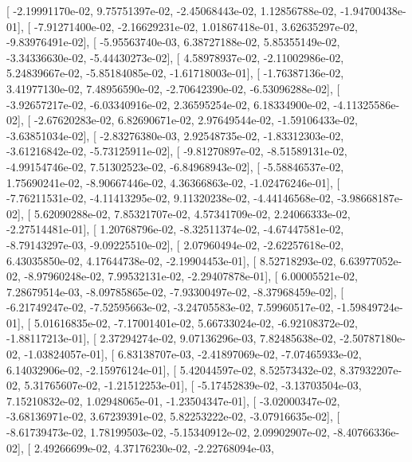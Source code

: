 \documentclass{article}
\begin{document}
       [ -2.19991170e-02,   9.75751397e-02,  -2.45068443e-02,
          1.12856788e-02,  -1.94700438e-01],
       [ -7.91271400e-02,  -2.16629231e-02,   1.01867418e-01,
          3.62635297e-02,  -9.83976491e-02],
       [ -5.95563740e-03,   6.38727188e-02,   5.85355149e-02,
         -3.34336630e-02,  -5.44430273e-02],
       [  4.58978937e-02,  -2.11002986e-02,   5.24839667e-02,
         -5.85184085e-02,  -1.61718003e-01],
       [ -1.76387136e-02,   3.41977130e-02,   7.48956590e-02,
         -2.70642390e-02,  -6.53096288e-02],
       [ -3.92657217e-02,  -6.03340916e-02,   2.36595254e-02,
          6.18334900e-02,  -4.11325586e-02],
       [ -2.67620283e-02,   6.82690671e-02,   2.97649544e-02,
         -1.59106433e-02,  -3.63851034e-02],
       [ -2.83276380e-03,   2.92548735e-02,  -1.83312303e-02,
         -3.61216842e-02,  -5.73125911e-02],
       [ -9.81270897e-02,  -8.51589131e-02,  -4.99154746e-02,
          7.51302523e-02,  -6.84968943e-02],
       [ -5.58846537e-02,   1.75690241e-02,  -8.90667446e-02,
          4.36366863e-02,  -1.02476246e-01],
       [ -7.76211531e-02,  -4.11413295e-02,   9.11320238e-02,
         -4.44146568e-02,  -3.98668187e-02],
       [  5.62090288e-02,   7.85321707e-02,   4.57341709e-02,
          2.24066333e-02,  -2.27514481e-01],
       [  1.20768796e-02,  -8.32511374e-02,  -4.67447581e-02,
         -8.79143297e-03,  -9.09225510e-02],
       [  2.07960494e-02,  -2.62257618e-02,   6.43035850e-02,
          4.17644738e-02,  -2.19904453e-01],
       [  8.52718293e-02,   6.63977052e-02,  -8.97960248e-02,
          7.99532131e-02,  -2.29407878e-01],
       [  6.00005521e-02,   7.28679514e-03,  -8.09785865e-02,
         -7.93300497e-02,  -8.37968459e-02],
       [ -6.21749247e-02,  -7.52595663e-02,  -3.24705583e-02,
          7.59960517e-02,  -1.59849724e-01],
       [  5.01616835e-02,  -7.17001401e-02,   5.66733024e-02,
         -6.92108372e-02,  -1.88117213e-01],
       [  2.37294274e-02,   9.07136296e-03,   7.82485638e-02,
         -2.50787180e-02,  -1.03824057e-01],
       [  6.83138707e-03,  -2.41897069e-02,  -7.07465933e-02,
          6.14032906e-02,  -2.15976124e-01],
       [  5.42044597e-02,   8.52573432e-02,   8.37932207e-02,
          5.31765607e-02,  -1.21512253e-01],
       [ -5.17452839e-02,  -3.13703504e-03,   7.15210832e-02,
          1.02948065e-01,  -1.23504347e-01],
       [ -3.02000347e-02,  -3.68136971e-02,   3.67239391e-02,
          5.82253222e-02,  -3.07916635e-02],
       [ -8.61739473e-02,   1.78199503e-02,  -5.15340912e-02,
          2.09902907e-02,  -8.40766336e-02],
       [  2.49266699e-02,   4.37176230e-02,  -2.22768094e-03,
\end{document}
